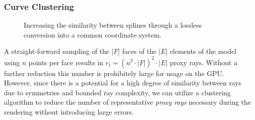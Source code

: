 \subsubsection{Curve Clustering} \label{contributions:fem:curves}
\begin{figure}
\centering
{}
\caption{Increasing the similarity between splines through a lossless conversion into a common coordinate system.}
\label{contributions:fem:splines}
\end{figure}



A straight-forward sampling of the $|F|$ faces of the $|E|$ elements of the model using $n$ points per face results in $r_t = \left( n^2 \cdot |F| \right) ^2 \cdot |E|$ proxy rays.  Without a further reduction this number is prohibitely large for usage on the GPU.  However, since there is a potential for a high degree of similarity between rays due to symmetries and bounded ray complexity, we can utilize a clustering algorithm to reduce the number of representative \emph{proxy rays} necessary during the rendering without introducing large errors.

